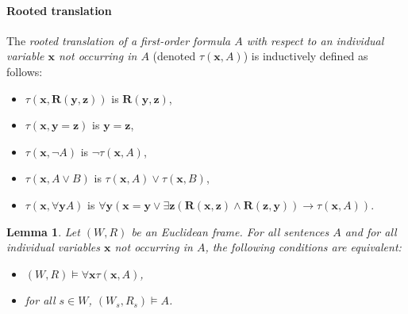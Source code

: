 \documentclass[draft]{article}
\newtheorem{lemma}{Lemma}
\begin{document}
\paragraph{Rooted translation}
%
%
The {\it rooted translation of a first-order formula $A$ with respect to an individual variable $\mathbf{x}$ not occurring in $A$}\/ (denoted $\tau(\mathbf{x},A)$) is inductively defined as follows:
%
%
\begin{itemize}
%
%
\item $\tau(\mathbf{x},\mathbf{R}(\mathbf{y},\mathbf{z}))$ is $\mathbf{R}(\mathbf{y},\mathbf{z})$,
%
%
\item $\tau(\mathbf{x},\mathbf{y}=\mathbf{z})$ is $\mathbf{y}=\mathbf{z}$,
%
%
\item $\tau(\mathbf{x},\neg A)$ is $\neg\tau(\mathbf{x},A)$,
%
%
\item $\tau(\mathbf{x},A\vee B)$ is $\tau(\mathbf{x},A)\vee\tau(\mathbf{x},B)$,
%
%
%
%
\item $\tau(\mathbf{x},\forall\mathbf{y}A)$ is $\forall\mathbf{y}(\mathbf{x}=\mathbf{y}\vee\exists\mathbf{z}(\mathbf{R}(\mathbf{x},\mathbf{z})\wedge\mathbf{R}(\mathbf{z},\mathbf{y}))\rightarrow\tau(\mathbf{x},A))$.
%
%
\end{itemize}
%
%
%
%
%
%
%
%
%
%
%
%
%
%
%
%
\begin{lemma}\label{lemma:about:the:rooted:translation}
%
%
Let $(W,R)$ be an Euclidean frame.
For all sentences $A$ and for all individual variables $\mathbf{x}$ not occurring in $A$, the following conditions are equivalent:
%
%
\begin{itemize}
%
%
\item $(W,R){\models}\forall\mathbf{x}\tau(\mathbf{x},A)$,
%
%
\item for all $s{\in}W$, $(W_{s},R_{s}){\models}A$.
%
%
\end{itemize}
%
%
\end{lemma}
%
%
%
%
\end{document}
